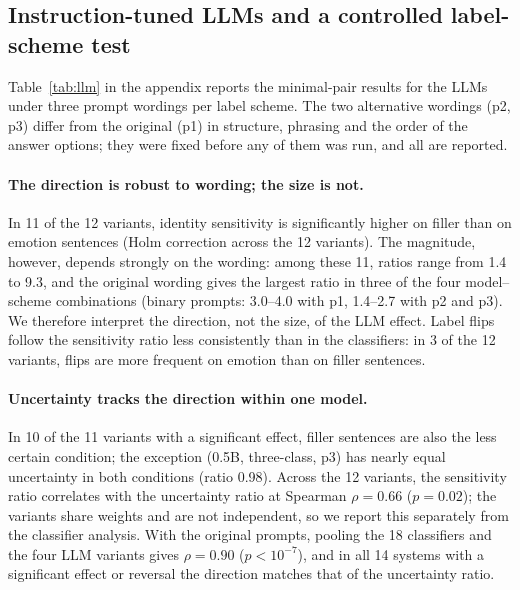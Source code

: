 \documentclass[runningheads]{llncs}
\begin{document}
\subsection{Instruction-tuned LLMs and a controlled label-scheme test}\label{sec:llm}
Table~\ref{tab:llm} in the appendix reports the minimal-pair results for the LLMs under three
prompt wordings per label scheme. The two alternative wordings (p2, p3) differ
from the original (p1) in structure, phrasing and the order of the answer
options; they were fixed before any of them was run, and all are reported.

\paragraph{The direction is robust to wording; the size is not.} In 11 of the
12 variants, identity sensitivity is significantly higher on filler than on
emotion sentences (Holm correction across the 12 variants). The magnitude,
however, depends strongly on the wording: among these 11, ratios range from 1.4
to 9.3, and the
original wording gives the largest ratio in three of the four model--scheme
combinations (binary prompts: 3.0--4.0 with p1, 1.4--2.7 with p2 and p3). We
therefore interpret the direction, not the size, of the LLM effect. Label flips
follow the sensitivity ratio less consistently than in the classifiers: in 3 of
the 12 variants, flips are more frequent on emotion than on filler sentences.

\paragraph{Uncertainty tracks the direction within one model.} In 10 of the
11 variants with a significant effect, filler sentences are also the less
certain condition; the exception (0.5B, three-class, p3) has nearly equal
uncertainty in both conditions (ratio 0.98). Across the 12 variants, the
sensitivity ratio correlates with the uncertainty ratio at Spearman
$\rho=0.66$ ($p=0.02$); the variants share weights and are not independent, so
we report this separately from the classifier analysis. With the original
prompts, pooling the 18 classifiers and the four LLM variants gives
$\rho=0.90$ ($p<10^{-7}$), and in all 14 systems with a significant effect or
reversal the direction matches that of the uncertainty ratio.
\end{document}
